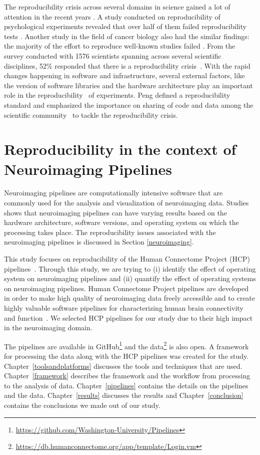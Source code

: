 The reproducibility crisis across several domains in science gained a lot of attention in the recent years 
\cite{aac4716,Begley2012,Button2013,Baker2016,Gla15}. 
A study conducted on reproducibility of psychological experiments 
revealed that over half of them failed reproducibility tests
\cite{aac4716}. Another study in the field of cancer biology also had 
the similar findings: the majority of the effort to reproduce well-known 
studies failed \cite{Begley2012}. From the survey conducted with 1576 
scientists spanning across several scientific disciplines, 52\% 
responded that there is a reproducibility crisis~\cite{Baker2016}. With the rapid changes 
happening in software and infrastructure, several external factors, like 
the version of software libraries and the hardware architecture play
an important role in the 
reproducibility~\cite{10.1371/journal.pone.0038234,Gla15} of 
experiments. Peng defined a reproducibility standard and emphasized 
the importance on sharing of code and data among the scientific 
community~\cite{Peng2011} to tackle the reproducibility  crisis.

\section{Reproducibility in the context of Neuroimaging Pipelines}
Neuroimaging pipelines are computationally intensive software that are 
commonly used for the analysis and visualization of neuroimaging data. 
Studies~\cite{10.1371/journal.pone.0038234,Gla15} shows that 
neuroimaging pipelines can have varying results based on the hardware 
architecture, software versions, and operating system on which the 
processing takes place. The reproducibility issues associated with the 
neuroimaging pipelines is discussed in Section \ref{neuroimaging}.

This study focuses on reproducibility of the Human Connectome Project (HCP) pipelines~\cite{Gla13}. 
Through this study, we are trying to (i) identify the effect of operating system on neuroimaging pipelines and (ii) quantify the effect of operating systems on neuroimaging pipelines. 
Human Connectome Project pipelines are developed in order to make high quality of neuroimaging data freely accessible and to create highly valuable software pipelines for characterizing human brain connectivity and function~\cite{VanEssen2013}. 
We selected HCP pipelines for our study due to their high impact in the neuroimaging domain.

The pipelines are available in 
GitHub\footnote{\url{https://github.com/Washington-University/Pipelines}} 
and the data\footnote{\url{https://db.humanconnectome.org/app/template/Login.vm}} 
is also open. A framework for processing the data along with the HCP 
pipelines was created for the study. Chapter~\ref{toolsandplatforms} 
discusses the tools and techniques that are used. 
Chapter~\ref{framework} describes the framework and the workflow from 
processing to the analysis of data. Chapter~\ref{pipelines} contains 
the details on the pipelines and the data. Chapter~\ref{results} 
discusses the results and Chapter~\ref{conclusion} contains the 
conclusions we made out of our study.

